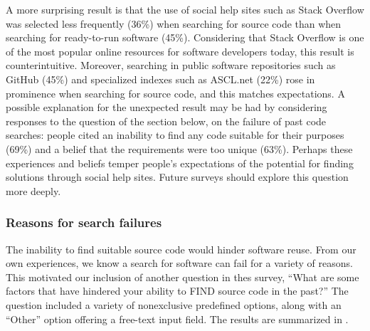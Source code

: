 \documentclass{casicswhitepaper}
\begin{document}
A more surprising result is that the use of social help sites such as Stack Overflow was selected less frequently (36\%) when searching for source code than when searching for ready-to-run software (45\%).  Considering that Stack Overflow is one of the most popular online resources for software developers today, this result is counterintuitive.  Moreover, searching in public software repositories such as GitHub (45\%) and specialized indexes such as ASCL.net (22\%) rose in prominence when searching for source code, and this matches expectations.  A possible explanation for the unexpected result may be had by considering responses to the question of the section below, on the failure of past code searches: people cited an inability to find any code suitable for their purposes (69\%) and a belief that the requirements were too unique (63\%).  Perhaps these experiences and beliefs temper people's expectations of the potential for finding solutions through social help sites.  Future surveys should explore this question more deeply.




\subsubsection{Reasons for search failures}
\label{reasons-for-search-failure}

The inability to find suitable source code would hinder software reuse.  From our own experiences, we know a search for software can fail for a variety of reasons.  This motivated our inclusion of another question in thes survey, ``What are some factors that have hindered your ability to FIND source code in the past?''  The question included a variety of nonexclusive predefined options, along with an ``Other'' option offering a free-text input field.  The results are summarized in .
\end{document}
